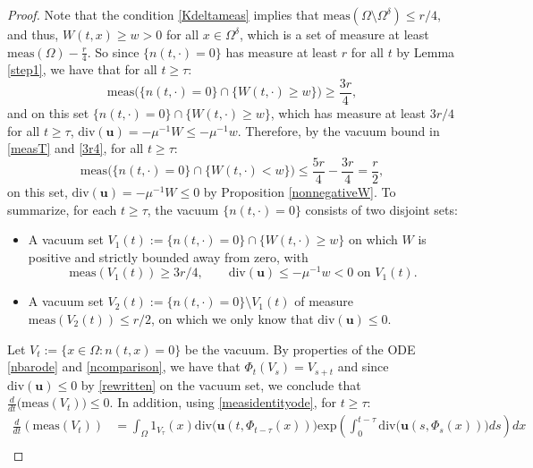 \documentclass[12pt]{article}
\newcommand{\bd}{\boldsymbol}
\theoremstyle{plain}
\begin{document}
\begin{proof}
Note that the condition \eqref{Kdeltameas} implies that $\text{meas}(\Omega \setminus \Omega^{\delta})\le r/4$, and thus, $W(t, x) \ge w > 0$ for all $x \in \Omega^\delta$, which is a set of measure at least $\displaystyle \text{meas}(\Omega) - \frac{r}{4}$. So since $\{n(t, \cdot) = 0\}$ has measure at least $r$ for all $t$ by Lemma \ref{step1}, we have that for all $t \ge \tau$:
\begin{equation}\label{3r4}
\text{meas}\Big(\{n(t, \cdot) = 0\} \cap \{W(t, \cdot) \ge w\}\Big) \ge \frac{3r}{4},
\end{equation}
and on this set $\{n(t, \cdot) = 0\} \cap \{W(t, \cdot) \ge w\}$, which has measure at least $3r/4$ for all $t \ge \tau$, $\text{div}(\bd{u}) = -\mu^{-1} W \le -\mu^{-1}w$. Therefore, by the vacuum bound in \eqref{measT} and \eqref{3r4}, for all $t \ge \tau$:
\begin{equation*}
\text{meas}\Big(\{n(t, \cdot) = 0\} \cap \{W(t, \cdot) < w\}\Big) \le \frac{5r}{4} - \frac{3r}{4} = \frac{r}{2},
\end{equation*}
on this set, $\text{div}(\bd{u}) = -\mu^{-1}W \le 0$ by Proposition \ref{nonnegativeW}. To summarize, for each $t \ge \tau$, the vacuum $\{n(t, \cdot) = 0\}$ consists of two disjoint sets:
\begin{itemize}
\item A vacuum set $V_{1}(t) := \{n(t, \cdot) = 0\} \cap \{W(t, \cdot) \ge w\}$ on which $W$ is positive and strictly bounded away from zero, with 
\begin{equation}\label{V1prop}
\text{meas}(V_{1}(t)) \ge 3r/4, \qquad \text{div}(\bd{u}) \le -\mu^{-1}w < 0 \text{ on } V_{1}(t).
\end{equation}
\item A vacuum set $V_{2}(t) := \{n(t, \cdot) = 0\} \setminus V_{1}(t)$ of measure $\text{meas}(V_{2}(t)) \le r/2$, on which we only know that $\text{div}(\bd{u}) \le 0$. 
\end{itemize}
Let $V_{t} := \{x \in \Omega : n(t, x) = 0\}$ be the vacuum. By properties of the ODE \eqref{nbarode} and \eqref{ncomparison}, we have that $\Phi_{t}(V_{s}) = V_{s + t}$ and since $\text{div}(\bd{u}) \le 0$ by \eqref{rewritten} on the vacuum set, we conclude that $\displaystyle \frac{d}{dt}\Big(\text{meas}(V_{t})\Big) \le 0$. In addition, using \eqref{measidentityode}, for $t \ge \tau$:
\begin{align*}
\frac{d}{dt}(\text{meas}(V_{t})) &= \int_{\Omega} 1_{V_{\tau}}(x) \text{div}\Big(\bd{u}(t, \Phi_{t - \tau}(x))\Big) \text{exp}\left(\int_{0}^{t - \tau} \text{div}\Big(\bd{u}(s, \Phi_{s}(x))\Big) ds\right) dx \\

\end{align*}
\end{proof}
\end{document}
